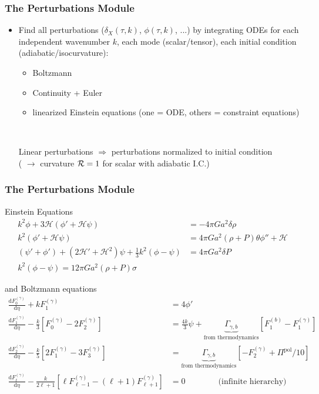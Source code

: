 \begin{frame}[fragile]
	\frametitle{The Perturbations Module}
	
	\begin{itemize}
		\item
		Find all perturbations ($\delta_X(\tau,k)$, $\phi(\tau,k)$, ...)  by integrating ODEs for each independent wavenumber $k$, each mode (scalar/tensor), each initial condition (adiabatic/isocurvature):
		\begin{itemize}
			\item \scriptsize Boltzmann
			\item  \scriptsize Continuity + Euler
			\item \scriptsize linearized Einstein equations (one = ODE, others = constraint equations)
			
			\mbox{}\\
			
		\end{itemize}
		Linear perturbations $\Rightarrow$ perturbations normalized to initial condition \\
		({\Red \CLASS{}} $\rightarrow$ curvature ${\cal R}=1$ for scalar with adiabatic I.C.)
	\end{itemize}
\end{frame}

\begin{frame}[fragile]
	\frametitle{The Perturbations Module}
	
	Einstein Equations
	\begin{align}
		k^2 \phi + 3\mathcal{H} (\phi'+\mathcal{H}\psi) &= -4\pi G a^2 \delta \rho\\
		k^2 (\phi'+\mathcal{H}\psi) &= 4\pi G a^2 (\rho+P) \theta
		\phi''+\mathcal{H}\\ (\psi'+\phi')+(2\mathcal{H}'+\mathcal{H}^2) \psi + \frac{1}{3}k^2 (\phi-\psi) &= 4\pi G a^2 \delta P\\
		k^2 (\phi-\psi) = 12\pi G a^2 (\rho+P) \sigma
	\end{align}
	
	and Boltzmann equations
	\begin{align}
		\frac{\mathrm{d}F_0^{(\gamma)}}{\mathrm{d}\eta} + k F_1^{(\gamma)} &= 4\phi'\\
		\frac{\mathrm{d}F_1^{(\gamma)}}{\mathrm{d}\eta} - \frac{k}{3} \left[F_0^{(\gamma)} - 2 F_2^{(\gamma)}\right] &= \frac{4 k}{3} \psi + \underbrace{\Gamma_{\gamma,b}}_\text{from thermodynamics} [F_1^{(b)}-F_1^{(\gamma)}]\\
		\frac{\mathrm{d}F_2^{(\gamma)}}{\mathrm{d}\eta} - \frac{k}{5} \left[2 F_1^{(\gamma)} - 3 F_3^{(\gamma)}\right] &= \underbrace{\Gamma_{\gamma,b}}_\text{from thermodynamics} [-F_2^{(\gamma)}+\Pi^\mathrm{pol}/10]\\
		\frac{\mathrm{d}F_\ell^{(\gamma)}}{\mathrm{d}\eta} - \frac{k}{2\ell+1} \left[\ell F_{\ell-1}^{(\gamma)} - (\ell+1) F_{\ell+1}^{(\gamma)}\right] &= 0 \qquad \qquad \text{(infinite hierarchy)}
	\end{align}
\end{frame}

